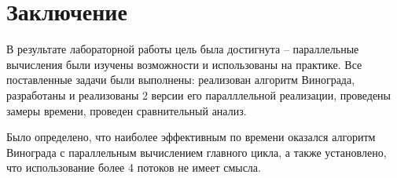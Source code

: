 \chapter*{Заключение}
\label{cha:conclusion}
В результате лабораторной работы цель была достигнута -- параллельные вычисления были изучены возможности и использованы на практике. Все поставленные задачи были выполнены: реализован алгоритм Винограда, разработаны и реализованы 2 версии его паралллельной реализации, проведены замеры времени, проведен сравнительный анализ.
\par Было определено, что наиболее эффективным по времени оказался алгоритм Винограда с параллельным вычислением главного цикла, а также установлено, что использование более 4 потоков не имеет смысла.